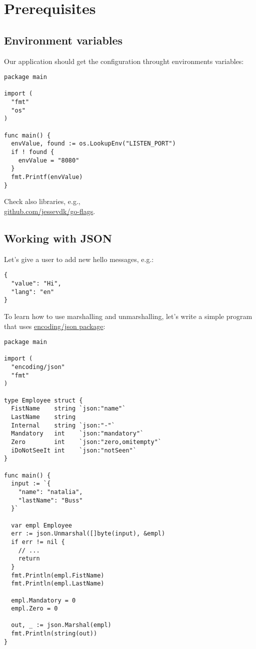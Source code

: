 \documentclass[11pt, letterpaper]{article}
\begin{document}
\section{Prerequisites}

\subsection{Environment variables}

Our application should get the configuration throught environments variables:

\begin{verbatim}
package main

import (
  "fmt"
  "os"
)

func main() {
  envValue, found := os.LookupEnv("LISTEN_PORT")
  if ! found {
    envValue = "8080"
  }
  fmt.Printf(envValue)
}
\end{verbatim}
\bigskip
Check also libraries, e.g.,\\ \href{https://github.com/jessevdk/go-flags}{github.com/jessevdk/go-flags}.

\subsection{Working with {\small JSON}}

Let's give a user to add new hello messages, e.g.:

\begin{verbatim}
{
  "value": "Hi",
  "lang": "en"
}
\end{verbatim}

To learn how to use marshalling and unmarshalling, let's write a simple program that uses \href{https://golang.org/pkg/encoding/json/}{encoding/json package}:

\begin{verbatim}
package main

import (
  "encoding/json"
  "fmt"
)

type Employee struct {
  FistName    string `json:"name"`
  LastName    string
  Internal    string `json:"-"`
  Mandatory   int    `json:"mandatory"`
  Zero        int    `json:"zero,omitempty"`
  iDoNotSeeIt int    `json:"notSeen"`
}

func main() {
  input := `{
    "name": "natalia",
    "lastName": "Buss"
  }`

  var empl Employee
  err := json.Unmarshal([]byte(input), &empl)
  if err != nil {
    // ...
    return
  }
  fmt.Println(empl.FistName)
  fmt.Println(empl.LastName)

  empl.Mandatory = 0
  empl.Zero = 0

  out, _ := json.Marshal(empl)
  fmt.Println(string(out))
}
\end{verbatim}
\end{document}
